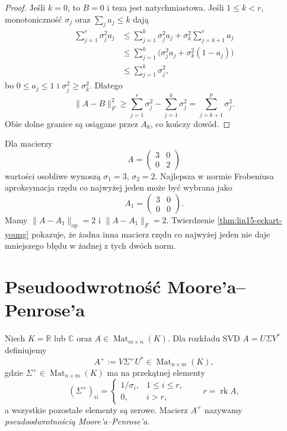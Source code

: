 \begin{proof}
Jeśli \(k=0\), to \(B=0\)
i teza jest natychmiastowa.
Jeśli \(1\le k<r\),
monotoniczność \(\sigma_j\)
oraz \(\sum_j a_j\le k\)
dają
\[
 \begin{aligned}
 \sum_{j=1}^r\sigma_j^2 a_j
 &\le\sum_{j=1}^k\sigma_j^2a_j+
       \sigma_k^2\sum_{j=k+1}^ra_j\\
 &\le\sum_{j=1}^k
       \bigl(\sigma_j^2a_j+
             \sigma_k^2(1-a_j)\bigr)\\
 &\le\sum_{j=1}^k\sigma_j^2,
 \end{aligned}
\]
bo \(0\le a_j\le1\)
i \(\sigma_j^2\ge\sigma_k^2\).
Dlatego
\[
 \|A-B\|_F^2
 \ge\sum_{j=1}^r\sigma_j^2-
      \sum_{j=1}^k\sigma_j^2
 =\sum_{j=k+1}^p\sigma_j^2.
\]
Obie dolne granice
są osiągane przez \(A_k\),
co kończy dowód.
\end{proof}

\begin{przyklad}
\label{prz:lin15-rank-one}
Dla macierzy
\[
 A=\begin{pmatrix}3&0\\0&2\end{pmatrix}
\]
wartości osobliwe wynoszą
\(\sigma_1=3\), \(\sigma_2=2\).
Najlepsza w normie
Frobeniusa aproksymacja
rzędu co najwyżej jeden
może być wybrana jako
\[
 A_1=\begin{pmatrix}3&0\\0&0\end{pmatrix}.
\]
Mamy
\(\|A-A_1\|_{\mathrm{op}}=2\)
i \(\|A-A_1\|_F=2\).
Twierdzenie
\ref{thm:lin15-eckart-young}
pokazuje, że żadna inna
macierz rzędu co najwyżej jeden
nie daje mniejszego błędu
w żadnej z tych dwóch norm.
\end{przyklad}

\section{Pseudoodwrotność Moore'a--Penrose'a}
\label{sec:lin15-pseudoinverse}

\begin{definicja}[Pseudoodwrotność]
\label{def:lin15-pseudoinverse}
Niech \(K=\mathbb R\) lub \(\mathbb C\)
oraz \(A\in\operatorname{Mat}_{m\times n}(K)\).
Dla rozkładu SVD
\(A=U\Sigma V^*\) definiujemy
\[
 A^+:=V\Sigma^+U^*
 \in\operatorname{Mat}_{n\times m}(K),
\]
gdzie
\(\Sigma^+\in\operatorname{Mat}_{n\times m}(K)\)
ma na przekątnej elementy
\[
 (\Sigma^+)_{ii}=
 \begin{cases}
 1/\sigma_i,&1\le i\le r,\\
 0,&i>r,
 \end{cases}
 \qquad r=\operatorname{rk}A,
\]
a wszystkie pozostałe elementy
są zerowe.
Macierz \(A^+\) nazywamy
\emph{pseudoodwrotnością
Moore'a--Penrose'a}.
\end{definicja}

